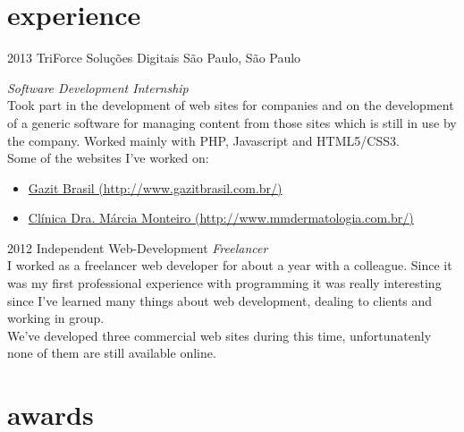 \documentclass[]{friggeri-cv} %
\begin{document}

\section{experience}

\begin{entrylist}


\entry
{2013}
{TriForce Soluções Digitais}
{São Paulo, São Paulo}
{\emph{Software Development Internship} \\
Took part in the development of web sites for companies and on the development of a generic software for managing content from those sites which is still in use by the company. Worked mainly with PHP, Javascript and HTML5/CSS3. \\
Some of the websites I've worked on:
\begin{itemize}
\item \href{http://www.gazitbrasil.com.br/}{Gazit Brasil (http://www.gazitbrasil.com.br/)}
\item \href{http://www.mmdermatologia.com.br/}{Clínica Dra. Márcia Monteiro (http://www.mmdermatologia.com.br/)}
\end{itemize}}

\entry
{2012}
{Independent Web-Development}
{}
{\emph{Freelancer} \\
I worked as a freelancer web developer for about a year with a colleague. Since it was my first professional experience with programming it was really interesting since I've learned many things about web development, dealing to clients and working in group. \\
We've developed three commercial web sites during this time, unfortunatenly none of them are still available online.}

\end{entrylist}


\section{awards}
\end{document}
